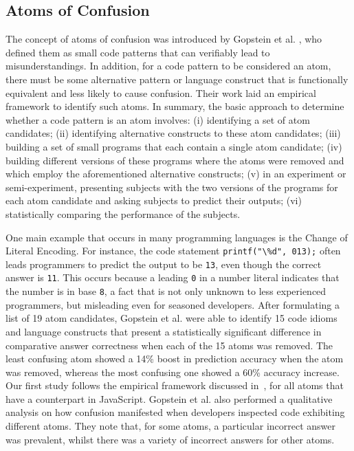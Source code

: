 \subsection{Atoms of Confusion}\label{sec:aoc}

The concept of atoms of confusion was introduced by Gopstein et al. \cite{DBLP:conf/msr/GopsteinZFC18}, who defined them as small code patterns that can verifiably lead to misunderstandings. In addition, for a code pattern to be considered an atom, there must be some alternative pattern or language construct that is functionally equivalent and less likely to cause confusion. Their work laid an empirical framework to identify such atoms. In summary, the basic approach to determine whether a code pattern is an atom involves: (i) identifying a set of atom candidates; (ii) identifying alternative constructs to these atom candidates; (iii) building a set of small programs that each contain a single atom candidate; (iv) building different versions of these programs where the atoms were removed and which employ the aforementioned alternative constructs; (v) in an experiment or semi-experiment, presenting subjects with the two versions of the programs for each atom candidate and asking subjects to predict their outputs; (vi) statistically comparing the performance of the subjects.

One main example that occurs in many programming languages is the Change of Literal Encoding. For instance, the \clang code statement \lstinline{printf("\%d", 013);} 
often leads programmers to predict the output to be \texttt{13}, even though the correct answer is \texttt{11}. This occurs because a leading \texttt{0} in a number literal indicates that the number is in base \texttt{8}, a fact that is not only unknown to less experienced programmers, but misleading even for seasoned developers. After formulating a list of 19 atom candidates, Gopstein et al. \cite{DBLP:conf/sigsoft/GopsteinIYDZYC17} were able to identify 15 code idioms and language constructs that present a statistically significant difference in comparative answer correctness when each of the 15 atoms was removed. The least confusing atom showed a 14\% boost in prediction accuracy when the atom was removed, whereas the most confusing one showed a 60\% accuracy increase. Our first study follows the empirical framework discussed in~\cite{DBLP:conf/sigsoft/GopsteinIYDZYC17}, for all atoms that have a counterpart in JavaScript. Gopstein et al. \cite{DBLP:conf/msr/GopsteinZFC18} also performed a qualitative analysis on how confusion manifested when developers inspected code exhibiting different atoms. They note that, for some atoms, a particular incorrect answer was prevalent, whilst there was a variety of incorrect answers for other atoms. 

